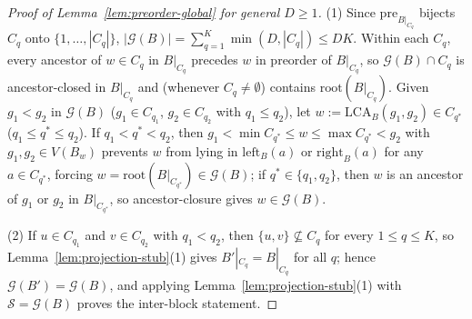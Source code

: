 \documentclass[11pt]{article}
\theoremstyle{definition}
\theoremstyle{remark}
\newcommand{\LCA}{\mathrm{LCA}}
\begin{document}
\begin{proof}[Proof of Lemma~\ref{lem:preorder-global} for general $D \ge 1$]
(1) Since $\mathrm{pre}_{B|_{C_q}}$ bijects $C_q$ onto $\{1, \dots, |C_q|\}$, $|\mathcal{G}(B)| = \sum_{q=1}^K \min(D, |C_q|) \le D K$. Within each $C_q$, every ancestor of $w \in C_q$ in $B|_{C_q}$ precedes $w$ in preorder of $B|_{C_q}$, so $\mathcal{G}(B) \cap C_q$ is ancestor-closed in $B|_{C_q}$ and (whenever $C_q \ne \emptyset$) contains $\mathrm{root}(B|_{C_q})$. Given $g_1 < g_2$ in $\mathcal{G}(B)$ ($g_1 \in C_{q_1}$, $g_2 \in C_{q_2}$ with $q_1 \le q_2$), let $w := \LCA_B(g_1, g_2) \in C_{q^*}$ ($q_1 \le q^* \le q_2$). If $q_1 < q^* < q_2$, then $g_1 < \min C_{q^*} \le w \le \max C_{q^*} < g_2$ with $g_1, g_2 \in V(B_w)$ prevents $w$ from lying in $\mathrm{left}_B(a)$ or $\mathrm{right}_B(a)$ for any $a \in C_{q^*}$, forcing $w = \mathrm{root}(B|_{C_{q^*}}) \in \mathcal{G}(B)$; if $q^* \in \{q_1, q_2\}$, then $w$ is an ancestor of $g_1$ or $g_2$ in $B|_{C_{q^*}}$, so ancestor-closure gives $w \in \mathcal{G}(B)$.

(2) If $u \in C_{q_1}$ and $v \in C_{q_2}$ with $q_1 < q_2$, then $\{u, v\} \not\subseteq C_q$ for every $1 \le q \le K$, so Lemma~\ref{lem:projection-stub}(1) gives $B'|_{C_q} = B|_{C_q}$ for all $q$; hence $\mathcal{G}(B') = \mathcal{G}(B)$, and applying Lemma~\ref{lem:projection-stub}(1) with $\mathcal{S} = \mathcal{G}(B)$ proves the inter-block statement.


\end{proof}
\end{document}
